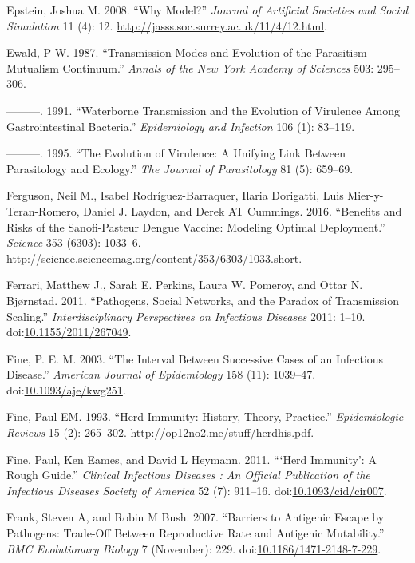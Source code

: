 \documentclass[]{book}
\theoremstyle{definition}
\theoremstyle{definition}
\theoremstyle{definition}
\theoremstyle{remark}
\begin{document}
\hypertarget{ref-epstein08}{}
Epstein, Joshua M. 2008. ``Why Model?'' \emph{Journal of Artificial
Societies and Social Simulation} 11 (4): 12.
\url{http://jasss.soc.surrey.ac.uk/11/4/12.html}.

\hypertarget{ref-ewald87}{}
Ewald, P W. 1987. ``Transmission Modes and Evolution of the
Parasitism-Mutualism Continuum.'' \emph{Annals of the New York Academy
of Sciences} 503: 295--306.

\hypertarget{ref-ewald91}{}
---------. 1991. ``Waterborne Transmission and the Evolution of
Virulence Among Gastrointestinal Bacteria.'' \emph{Epidemiology and
Infection} 106 (1): 83--119.

\hypertarget{ref-ewald95}{}
---------. 1995. ``The Evolution of Virulence: A Unifying Link Between
Parasitology and Ecology.'' \emph{The Journal of Parasitology} 81 (5):
659--69.

\hypertarget{ref-ferguson16}{}
Ferguson, Neil M., Isabel Rodríguez-Barraquer, Ilaria Dorigatti, Luis
Mier-y-Teran-Romero, Daniel J. Laydon, and Derek AT Cummings. 2016.
``Benefits and Risks of the Sanofi-Pasteur Dengue Vaccine: Modeling
Optimal Deployment.'' \emph{Science} 353 (6303): 1033--6.
\url{http://science.sciencemag.org/content/353/6303/1033.short}.

\hypertarget{ref-ferrari11}{}
Ferrari, Matthew J., Sarah E. Perkins, Laura W. Pomeroy, and Ottar N.
Bjørnstad. 2011. ``Pathogens, Social Networks, and the Paradox of
Transmission Scaling.'' \emph{Interdisciplinary Perspectives on
Infectious Diseases} 2011: 1--10.
doi:\href{https://doi.org/10.1155/2011/267049}{10.1155/2011/267049}.

\hypertarget{ref-fine03}{}
Fine, P. E. M. 2003. ``The Interval Between Successive Cases of an
Infectious Disease.'' \emph{American Journal of Epidemiology} 158 (11):
1039--47.
doi:\href{https://doi.org/10.1093/aje/kwg251}{10.1093/aje/kwg251}.

\hypertarget{ref-fine93}{}
Fine, Paul EM. 1993. ``Herd Immunity: History, Theory, Practice.''
\emph{Epidemiologic Reviews} 15 (2): 265--302.
\url{http://op12no2.me/stuff/herdhis.pdf}.

\hypertarget{ref-fine11}{}
Fine, Paul, Ken Eames, and David L Heymann. 2011. ```Herd Immunity': A
Rough Guide.'' \emph{Clinical Infectious Diseases : An Official
Publication of the Infectious Diseases Society of America} 52 (7):
911--16.
doi:\href{https://doi.org/10.1093/cid/cir007}{10.1093/cid/cir007}.

\hypertarget{ref-frank07}{}
Frank, Steven A, and Robin M Bush. 2007. ``Barriers to Antigenic Escape
by Pathogens: Trade-Off Between Reproductive Rate and Antigenic
Mutability.'' \emph{BMC Evolutionary Biology} 7 (November): 229.
doi:\href{https://doi.org/10.1186/1471-2148-7-229}{10.1186/1471-2148-7-229}.
\end{document}
